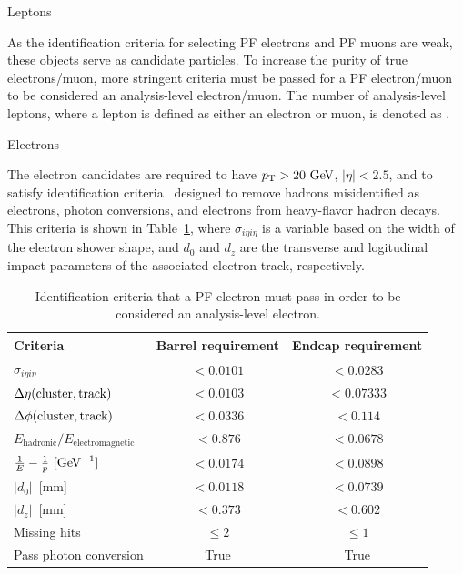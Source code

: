 \begin{section}{Leptons}

As the identification criteria for selecting PF electrons and PF muons are weak, these objects serve as candidate particles. 
To increase the purity of true electrons/muon, more stringent criteria must be passed for a PF electron/muon to be considered an analysis-level electron/muon.
The number of analysis-level leptons, where a lepton is defined as either an electron or muon, is denoted as \Nleps.

\begin{subsection}{Electrons}

The electron candidates are required to have $p_{\mathrm{T}} > 20~\mathrm{Ge\kern -0.1em V}$, $|\eta| < 2.5$, and to satisfy identification criteria~\cite{electron_id} designed to remove hadrons misidentified as electrons, photon conversions, and electrons from heavy-flavor hadron decays. 
This criteria is shown in Table~\ref{tab:electron_id}, where $\sigma_{i\eta i\eta}$ is a variable based on the width of the electron shower shape, and $d_0$ and $d_z$ are the transverse and logitudinal impact parameters of the associated electron track, respectively.

\begin{table}[tb!]
\centering
\begin{tabular}{l|cc}
\hline \hline
Criteria                                          &  Barrel requirement  & Endcap requirement \\
\hline
$\sigma_{i\eta i\eta}$                            &  $< 0.0101$          &  $< 0.0283 $       \\
$\Delta\eta\mathrm{(cluster,track)}$                 &  $< 0.0103$          &  $< 0.07333$       \\
$\Delta\phi\mathrm{(cluster,track)}$                 &  $< 0.0336$          &  $< 0.114  $       \\
$E_{\text{hadronic}}/E_{\text{electromagnetic}}$  &  $< 0.876 $          &  $< 0.0678 $       \\
$\frac{1}{E} - \frac{1}{p}~[\mathrm{Ge\kern -0.1em V}^{-1}]$           &  $< 0.0174$          &  $< 0.0898 $       \\
$|d_0|$~[mm]                                      &  $< 0.0118$          &  $< 0.0739 $       \\
$|d_z|$~[mm]                                      &  $< 0.373 $          &  $< 0.602  $       \\
Missing hits                                      &  $\leq 2  $          &  $\leq 1   $       \\
Pass photon conversion                            & True                 & True               \\
\hline \hline
\end{tabular}
\caption{Identification criteria that a PF electron must pass in order to be considered an analysis-level electron.}
\label{tab:electron_id}
\end{table}


\end{subsection}
\end{section}
